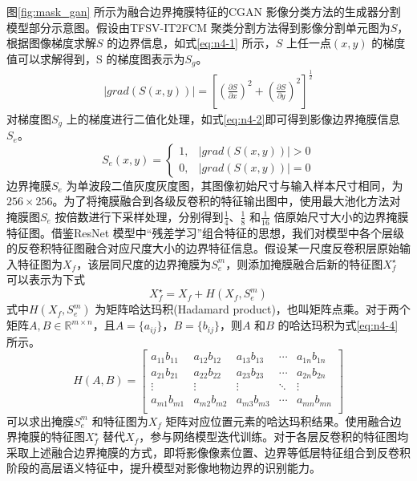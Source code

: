 图\ref{fig:mask_gan} 所示为融合边界掩膜特征的CGAN 影像分类方法的生成器分割模型部分示意图。假设由TFSV-IT2FCM 聚类分割方法得到影像分割单元图为$S$，根据图像梯度求解$S$ 的边界信息，如式\ref{eq:n4-1} 所示，$S$ 上任一点$(x,y)$ 的梯度值可以求解得到，S 的梯度图表示为$S_g$。
\begin{equation}\label{eq:n4-1}
    \begin{split}
        |grad(S(x,y))| = [(\frac{\partial S}{\partial x})^2 + (\frac{\partial S}{\partial y})^2]^{\frac{1}{2}}
    \end{split}
\end{equation}
对梯度图$S_g$ 上的梯度进行二值化处理，如式\ref{eq:n4-2}即可得到影像边界掩膜信息$S_e$。
\begin{equation}\label{eq:n4-2}
    S_e(x,y) =
    \begin{cases}
        1, & |grad(S(x,y))| > 0 \\
        0, & |grad(S(x,y))| = 0
    \end{cases}
\end{equation}
边界掩膜$S_e$ 为单波段二值灰度灰度图，其图像初始尺寸与输入样本尺寸相同，为$256\times 256$。为了将掩膜融合到各级反卷积的特征输出图中，使用最大池化方法对掩膜图$S_e$ 按倍数进行下采样处理，分别得到$\frac{1}{4}$、$\frac{1}{8}$ 和$\frac{1}{16}$ 倍原始尺寸大小的边界掩膜特征图。借鉴ResNet\cite{he2016deep} 模型中“残差学习”组合特征的思想，我们对模型中各个层级的反卷积特征图融合对应尺度大小的边界特征信息。假设某一尺度反卷积层原始输入特征图为$X_f$，该层同尺度的边界掩膜为$S_e^m$，则添加掩膜融合后新的特征图$X_f^\star$ 可以表示为下式
\begin{equation}\label{eq:n4-3}
    X_f^\star = X_f + H(X_f, S_e^m)
\end{equation}
式中$ H(X_f, S_e^m)$ 为矩阵哈达玛积\cite{horn1990hadamard}(Hadamard product)，也叫矩阵点乘。对于两个矩阵$A,B \in \mathbb{R}^{m\times n}$，且$A=\{a_{ij}\}$，$B=\{b_{ij}\}$，则$A$ 和$B$ 的哈达玛积为式\ref{eq:n4-4} 所示。
\begin{equation}\label{eq:n4-4}
    H(A,B) =
    \left[
        \begin{matrix}
            a_{11}b_{11} & a_{12}b_{12} & a_{13}b_{13} & \cdots & a_{1n}b_{1n} \\
            a_{21}b_{21} & a_{22}b_{22} & a_{23}b_{23} & \cdots & a_{2n}b_{2n} \\
            \vdots       & \vdots       & \vdots       & \ddots & \vdots       \\
            a_{m1}b_{m1} & a_{m2}b_{m2} & a_{m3}b_{m3} & \cdots & a_{mn}b_{mn} \\
        \end{matrix}
        \right]
\end{equation}
可以求出掩膜$S_e^m$ 和特征图为$X_f$ 矩阵对应位置元素的哈达玛积结果。使用融合边界掩膜的特征图$X_f^\star$ 替代$X_f$，参与网络模型迭代训练。对于各层反卷积的特征图均采取上述融合边界掩膜的方式，即将影像像素位置、边界等低层特征组合到反卷积阶段的高层语义特征中，提升模型对影像地物边界的识别能力。


